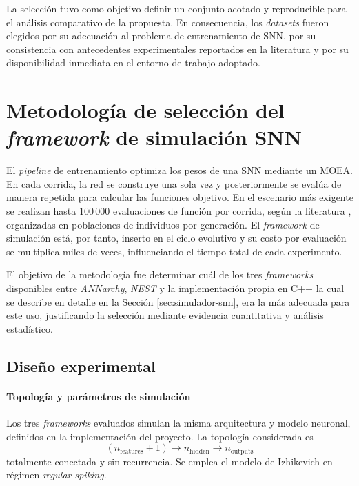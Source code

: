 La selección tuvo como objetivo definir un conjunto acotado y reproducible para el análisis comparativo de la propuesta. En consecuencia, los \textit{datasets} fueron elegidos por su adecuación al problema de entrenamiento de SNN, por su consistencia con antecedentes experimentales reportados en la literatura y por su disponibilidad inmediata en el entorno de trabajo adoptado.


\section{Metodología de selección del \textit{framework} de simulación SNN}
\label{sec:benchmark-framework-metodologia}

El \textit{pipeline} de entrenamiento optimiza los pesos de una SNN mediante un MOEA. En cada corrida, la red se construye una sola vez y posteriormente se evalúa de manera repetida para calcular las funciones objetivo. En el escenario más exigente se realizan hasta 100\,000 evaluaciones de función por corrida, según la literatura \cite{MOEA/CKF, 10066873_S-NSGA-II}, organizadas en poblaciones de individuos por generación. El \textit{framework} de simulación está, por tanto, inserto en el ciclo evolutivo y su costo por evaluación se multiplica miles de veces, influenciando el tiempo total de cada experimento.

El objetivo de la metodología fue determinar cuál de los tres \textit{frameworks} disponibles entre \textit{ANNarchy}, \textit{NEST} y la implementación propia en C++ la cual se describe en detalle en la Sección \ref{sec:simulador-snn}, era la más adecuada para este uso, justificando la selección mediante evidencia cuantitativa y análisis estadístico.

\subsection{Diseño experimental}

\paragraph{Topología y parámetros de simulación}

Los tres \textit{frameworks} evaluados simulan la misma arquitectura y modelo neuronal, definidos en la implementación del proyecto. La topología considerada es
\begin{equation}
(n_{\text{features}} + 1) \rightarrow n_{\text{hidden}} \rightarrow n_{\text{outputs}}
\label{eq:topologia_benchmark}
\end{equation}
totalmente conectada y sin recurrencia. Se emplea el modelo de Izhikevich en régimen \textit{regular spiking}.

